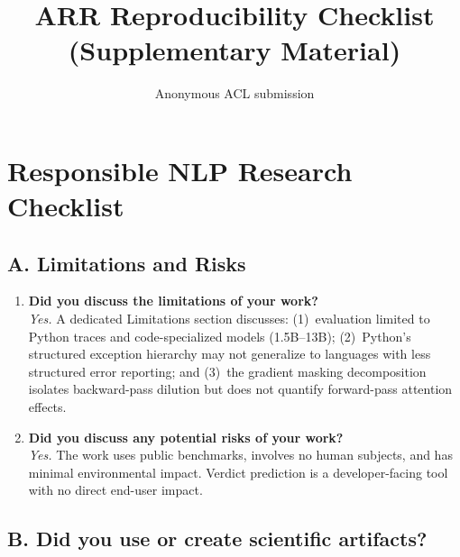 \documentclass[11pt,a4paper]{article}
\title{ARR Reproducibility Checklist\\(Supplementary Material)}
\author{Anonymous ACL submission}
\begin{document}
\maketitle

\section*{Responsible NLP Research Checklist}

\subsection*{A. Limitations and Risks}

\begin{enumerate}
\item \textbf{Did you discuss the limitations of your work?} \\
\textit{Yes.} A dedicated Limitations section discusses: (1)~evaluation limited to Python traces and code-specialized models (1.5B--13B); (2)~Python's structured exception hierarchy may not generalize to languages with less structured error reporting; and (3)~the gradient masking decomposition isolates backward-pass dilution but does not quantify forward-pass attention effects.

\item \textbf{Did you discuss any potential risks of your work?} \\
\textit{Yes.} The work uses public benchmarks, involves no human subjects, and has minimal environmental impact. Verdict prediction is a developer-facing tool with no direct end-user impact.
\end{enumerate}

\subsection*{B. Did you use or create scientific artifacts?}
\end{document}
